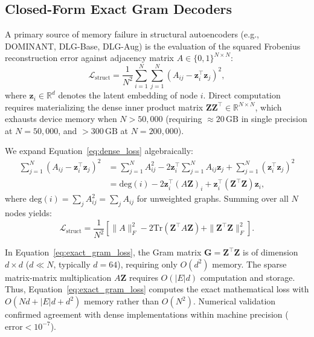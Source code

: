 \documentclass[11pt,a4paper]{article}
\begin{document}
\subsection{Closed-Form Exact Gram Decoders}
A primary source of memory failure in structural autoencoders (e.g., DOMINANT, DLG-Base, DLG-Aug) is the evaluation of the squared Frobenius reconstruction error against adjacency matrix $A \in \{0, 1\}^{N \times N}$:
\begin{equation}
\mathcal{L}_{\mathrm{struct}} = \frac{1}{N^2} \sum_{i=1}^N \sum_{j=1}^N \left(A_{ij} - \mathbf{z}_i^\top \mathbf{z}_j\right)^2,
\label{eq:dense_loss}
\end{equation}
where $\mathbf{z}_i \in \mathbb{R}^d$ denotes the latent embedding of node $i$. Direct computation requires materializing the dense inner product matrix $\mathbf{Z} \mathbf{Z}^\top \in \mathbb{R}^{N \times N}$, which exhausts device memory when $N > 50,000$ (requiring $\approx 20\,\text{GB}$ in single precision at $N=50,000$, and $>300\,\text{GB}$ at $N=200,000$).

We expand Equation~\eqref{eq:dense_loss} algebraically:
\begin{align}
\sum_{j=1}^N \left(A_{ij} - \mathbf{z}_i^\top \mathbf{z}_j\right)^2 &= \sum_{j=1}^N A_{ij}^2 - 2 \mathbf{z}_i^\top \sum_{j=1}^N A_{ij} \mathbf{z}_j + \sum_{j=1}^N (\mathbf{z}_i^\top \mathbf{z}_j)^2 \nonumber \\
&= \mathrm{deg}(i) - 2 \mathbf{z}_i^\top \left(A \mathbf{Z}\right)_i + \mathbf{z}_i^\top \left(\mathbf{Z}^\top \mathbf{Z}\right) \mathbf{z}_i,
\label{eq:gram_identity}
\end{align}
where $\mathrm{deg}(i) = \sum_j A_{ij}^2 = \sum_j A_{ij}$ for unweighted graphs. Summing over all $N$ nodes yields:
\begin{equation}
\mathcal{L}_{\mathrm{struct}} = \frac{1}{N^2} \left[ \|A\|_F^2 - 2 \mathrm{Tr}\left(\mathbf{Z}^\top A \mathbf{Z}\right) + \|\mathbf{Z}^\top \mathbf{Z}\|_F^2 \right].
\label{eq:exact_gram_loss}
\end{equation}

In Equation~\eqref{eq:exact_gram_loss}, the Gram matrix $\mathbf{G} = \mathbf{Z}^\top \mathbf{Z}$ is of dimension $d \times d$ ($d \ll N$, typically $d=64$), requiring only $O(d^2)$ memory. The sparse matrix-matrix multiplication $A \mathbf{Z}$ requires $O(|E|d)$ computation and storage. Thus, Equation~\eqref{eq:exact_gram_loss} computes the exact mathematical loss with $O(N d + |E| d + d^2)$ memory rather than $O(N^2)$. Numerical validation confirmed agreement with dense implementations within machine precision ($\text{error} < 10^{-7}$).
\end{document}
